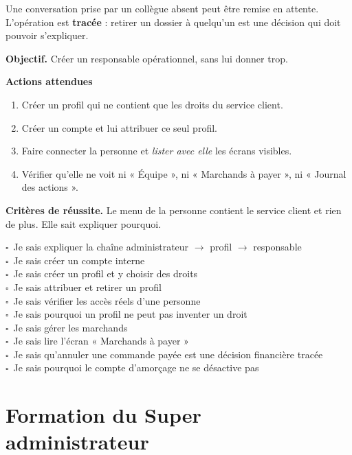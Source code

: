 \documentclass[11pt,a4paper]{report}
\newcommand{\case}{$\square$~}
\begin{document}
Une conversation prise par un collègue absent peut être remise en attente.
L'opération est \textbf{tracée} : retirer un dossier à quelqu'un est une
décision qui doit pouvoir s'expliquer.

\begin{exercice}
\textbf{Objectif.} Créer un responsable opérationnel, sans lui donner trop.

\medskip
\textbf{Actions attendues}
\begin{enumerate}[leftmargin=*,itemsep=1pt,topsep=2pt]
  \item Créer un profil qui ne contient que les droits du service client.
  \item Créer un compte et lui attribuer ce seul profil.
  \item Faire connecter la personne et \emph{lister avec elle} les écrans
        visibles.
  \item Vérifier qu'elle ne voit ni « Équipe », ni « Marchands à payer », ni
        « Journal des actions ».
\end{enumerate}

\medskip
\textbf{Critères de réussite.} Le menu de la personne contient le service
client et rien de plus. Elle sait expliquer pourquoi.
\end{exercice}

\begin{checklist}
\case Je sais expliquer la chaîne administrateur $\rightarrow$ profil $\rightarrow$ responsable\\
\case Je sais créer un compte interne\\
\case Je sais créer un profil et y choisir des droits\\
\case Je sais attribuer et retirer un profil\\
\case Je sais vérifier les accès réels d'une personne\\
\case Je sais pourquoi un profil ne peut pas inventer un droit\\
\case Je sais gérer les marchands\\
\case Je sais lire l'écran « Marchands à payer »\\
\case Je sais qu'annuler une commande payée est une décision financière tracée\\
\case Je sais pourquoi le compte d'amorçage ne se désactive pas
\end{checklist}

\chapter{Formation du Super administrateur}
\label{ch:superadmin}
\end{document}
